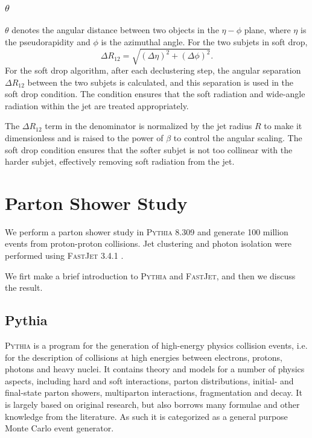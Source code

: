\documentclass[a4paper, 12pt]{article}
\begin{document}
		\subsubsection{$\theta$}
			$\theta$ denotes the angular distance between two objects in the $\eta-\phi$ plane, where $\eta$ is the pseudorapidity
			and $\phi$ is the azimuthal angle. For the two subjets in soft drop,
			\begin{equation}
				\Delta R_{12}=\sqrt{(\Delta \eta)^2+(\Delta \phi)^2}.
			\end{equation}
			For the soft drop algorithm, after each declustering step, the angular separation $\Delta R_{12}$ between the two
			subjets is calculated, and this separation is used in the soft drop condition. The condition ensures that the soft
			radiation and wide-angle radiation within the jet are treated appropriately.\par
			The $\Delta R_{12}$ term in the denominator is normalized by the jet radius $R$ to make it dimensionless and is raised
			to the power of $\beta$ to control the angular scaling. The soft drop condition ensures that the softer subjet is not
			too collinear with the harder subjet, effectively removing soft radiation from the jet.


\section{Parton Shower Study}
	We perform a parton shower study in \textsc{Pythia} 8.309 \cite{Sj_strand_2006} \cite{Sj_strand_2015} and generate 100 million
	events from proton-proton collisions. Jet clustering and photon isolation were performed using \textsc{FastJet} 3.4.1 \cite{Cacciari_2012}.\par
	We firt make a brief introduction to \textsc{Pythia} and \textsc{FastJet}, and then we discuss the result.
	\subsection{Pythia}
		\textsc{Pythia} is a program for the generation of high-energy physics collision events, i.e. for the description of collisions at
		high energies between electrons, protons, photons and heavy nuclei. It contains theory and models for a number of physics
		aspects, including hard and soft interactions, parton distributions, initial- and final-state parton showers, multiparton
		interactions, fragmentation and decay. It is largely based on original research, but also borrows many formulae and other
		knowledge from the literature. As such it is categorized as a general purpose Monte Carlo event generator.
\end{document}
